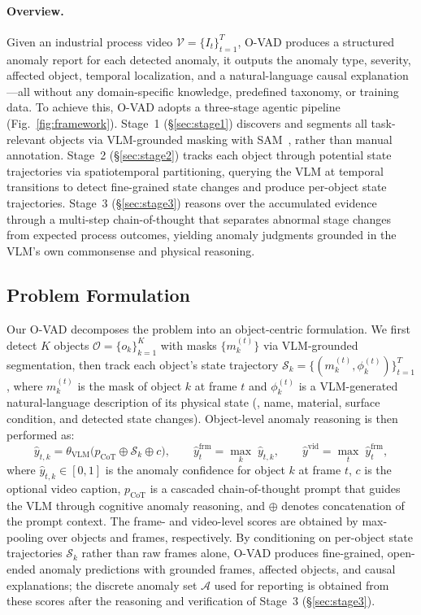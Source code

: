 \documentclass[runningheads]{llncs}
\begin{document}
\paragraph{\textbf{Overview.}}


Given an industrial process video $\mathcal{V}=\{I_t\}_{t=1}^{T}$, O-VAD produces a structured anomaly report for each detected anomaly, it outputs the anomaly type, severity, affected object, temporal localization, and a natural-language causal explanation---all without any domain-specific knowledge, predefined taxonomy, or training data.
% 
To achieve this, O-VAD adopts a three-stage agentic pipeline (Fig.~\ref{fig:framework}).
Stage~1 (\S\ref{sec:stage1}) discovers and segments all task-relevant objects via VLM-grounded masking with SAM~\cite{carion2025sam}, rather than manual annotation.
Stage~2 (\S\ref{sec:stage2}) tracks each object through potential state trajectories via spatiotemporal partitioning, querying the VLM at temporal transitions to detect fine-grained state changes and produce per-object state trajectories.
Stage~3 (\S\ref{sec:stage3}) reasons over the accumulated evidence through a multi-step chain-of-thought that separates abnormal stage changes from expected process outcomes, yielding anomaly judgments grounded in the VLM's own commonsense and physical reasoning.




\subsection{Problem Formulation}
\label{sec:formulation}
Our O-VAD decomposes the problem into an object-centric formulation. We first detect $K$ objects $\mathcal{O}=\{o_k\}_{k=1}^{K}$ with masks $\{m_k^{(t)}\}$ via VLM-grounded segmentation, then track each object's state trajectory $\mathcal{S}_k = \{(m_k^{(t)}, \phi_k^{(t)})\}_{t=1}^{T}$, where $m_k^{(t)}$ is the mask of object $k$ at frame $t$ and $\phi_k^{(t)}$ is a VLM-generated natural-language description of its physical state (\eg, name, material, surface condition, and detected state changes). Object-level anomaly reasoning is then performed as:
%
\begin{equation}
    \hat{y}_{t,k} = \theta_{\text{VLM}}\!\big(p_{\text{CoT}} \oplus \mathcal{S}_k \oplus c\big), \qquad
    \hat{y}^{\text{frm}}_t = \max_{k}\; \hat{y}_{t,k}, \qquad
    \hat{y}^{\text{vid}} = \max_{t}\; \hat{y}^{\text{frm}}_t,
\end{equation}
%
where $\hat{y}_{t,k}\in[0,1]$ is the anomaly confidence for object $k$ at frame $t$, $c$ is the optional video caption, $p_{\text{CoT}}$ is a cascaded chain-of-thought prompt that guides the VLM through cognitive anomaly reasoning, and $\oplus$ denotes concatenation of the prompt context. The frame- and video-level scores are obtained by max-pooling over objects and frames, respectively. By conditioning on per-object state trajectories $\mathcal{S}_k$ rather than raw frames alone, O-VAD produces fine-grained, open-ended anomaly predictions with grounded frames, affected objects, and causal explanations; the discrete anomaly set $\mathcal{A}$ used for reporting is obtained from these scores after the reasoning and verification of Stage~3 (\S\ref{sec:stage3}).
\end{document}
